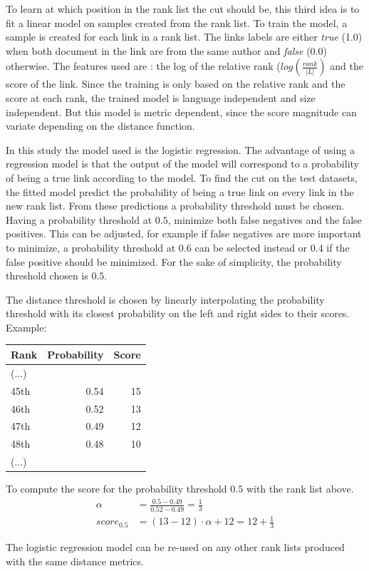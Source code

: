 To learn at which position in the rank list the cut should be, this third idea is to fit a linear model on samples created from the rank list.
To train the model, a sample is created for each link in a rank list.
The links labels are either \textit{true} (1.0) when both document in the link are from the same author and \textit{false} (0.0) otherwise.
The features used are : the log of the relative rank ($log(\frac{rank}{|L|})$ and the score of the link.
Since the training is only based on the relative rank and the score at each rank, the trained model is language independent and size independent.
But this model is metric dependent, since the score magnitude can variate depending on the distance function.

In this study the model used is the logistic regression.
The advantage of using a regression model is that the output of the model will correspond to a probability of being a true link according to the model.
To find the cut on the test datasets, the fitted model predict the probability of being a true link on every link in the new rank list.
From these predictions a probability threshold must be chosen.
Having a probability threshold at $0.5$, minimize both false negatives and the false positives.
This can be adjusted, for example if false negatives are more important to minimize, a probability threshold at $0.6$ can be selected instead or $0.4$ if the false positive should be minimized.
For the sake of simplicity, the probability threshold chosen is $0.5$.

The distance threshold is chosen by linearly interpolating the probability threshold with its closest probability on the left and right sides to their scores.
Example:

\begin{tabular}{l r r}
  \toprule
  Rank & Probability & Score \\
  \midrule
  (...) & &\\
  45th & 0.54 & 15 \\
  46th & 0.52 & 13 \\
  47th & 0.49 & 12 \\
  48th & 0.48 & 10 \\
  (...) & & \\
  \bottomrule
\end{tabular}

To compute the score for the probability threshold $0.5$ with the rank list above.
\begin{align}
    \alpha &= \frac{0.5 - 0.49}{0.52 - 0.49} = \frac{1}{3} \\
    \textit{score}_{0.5} &= (13 - 12) \cdot \alpha + 12 = 12 + \frac{1}{3}
\end{align}

The logistic regression model can be re-used on any other rank lists produced with the same distance metrics.
